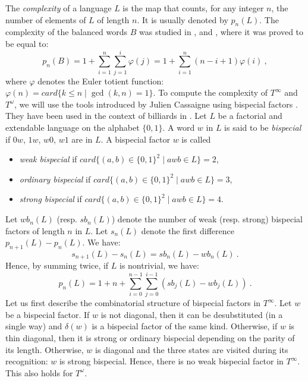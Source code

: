 \documentclass[preliminary]{eptcs}
\begin{document}
The \emph{complexity} of a language $L$ is the map that counts, for any
integer $n$, the number of elements of $L$ of length $n$. It is usually
denoted by $p_n(L)$.
\newline
The complexity of the balanced words $B$ was studied in
\cite{Lipatov1982}, \cite{Mignosi1991} and \cite{BerstelPocchiola1993},
where it was proved to be equal to:
$$ p_n(B) = 1 + \sum_{i=1}^{n}\sum_{j=1}^{i}\varphi(j) = 1 +
\sum_{i=1}^{n}(n-i+1)\varphi(i) \ ,$$
where $\varphi$ denotes the Euler totient function: $\varphi(n) = card \{
k \leq n \mid \gcd(k,n) = 1\}$.
\newline
\newline
To compute the complexity of $T^\infty$ and $T^\omega$, we will use the
tools introduced by Julien Cassaigne using bispecial factors
\cite{Cassaigne1997}. They have been used in the context of billiards in
\cite{CassaigneHubertTroubetzkoy2002}.
Let $L$ be a factorial and extendable language on the alphabet $\{0,1\}$.
A word $w$ in $L$ is said to be \emph{bispecial} if $0w$, $1w$, $w0$, $w1$
are in $L$. A bispecial factor $w$ is called 
\begin{itemize}
\item \emph{weak bispecial} if $card\{(a,b) \in \{0,1\}^2 \mid awb \in L \} = 2$, 
\item \emph{ordinary bispecial} if $card\{(a,b) \in \{0,1\}^2 \mid awb \in L \} = 3$,
\item \emph{strong bispecial} if $card\{(a,b) \in \{0,1\}^2 \mid awb \in L \} = 4$. 
\end{itemize}
Let $wb_n(L)$ (resp. $sb_n(L)$) denote the number of weak (resp. strong)
bispecial factors of length $n$ in $L$.
Let $s_n(L)$ denote the first difference $p_{n+1}(L) - p_n(L)$. We have:
$$s_{n+1}(L) - s_{n}(L) = sb_n(L) - wb_n(L) \ .$$
Hence, by summing twice, if $L$ is nontrivial, we have:
$$ p_n(L) = 1 + n + \sum_{i=0}^{n-1}\sum_{j=0}^{i-1} (sb_j(L) - wb_j(L)) \ .$$
\newline
Let us first describe the combinatorial structure of bispecial factors in
$T^\infty$.
Let $w$ be a bispecial factor.
If $w$ is not diagonal, then it can be desubstituted (in a single way) and
$\delta(w)$ is a bispecial factor of the same kind.
Otherwise, if $w$ is thin diagonal, then it is strong or ordinary
bispecial depending on the parity of its length. Otherwise, $w$ is
diagonal and the three states are visited during its recognition: $w$ is
strong bispecial.
Hence, there is no weak bispecial factor in $T^\infty$.
This also holds for $T^\omega$.
\newline
\end{document}
